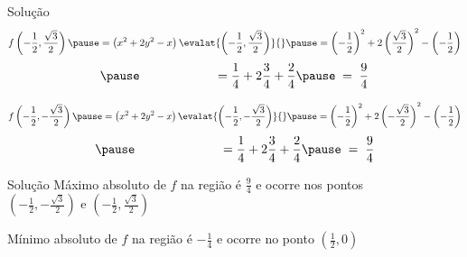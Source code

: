 \begin{resolution}{Solução}
  \[
    f\left(-\frac{1}{2}, \frac{\sqrt{3}}{2}\right)
    \pause
    = \left(x^2 + 2y^2 - x\right)\evalat{\left(-\frac{1}{2}, \frac{\sqrt{3}}{2}\right)}{}
    \pause
    = \left(-\frac{1}{2}\right)^2 + 2\left(\frac{\sqrt{3}}{2}\right)^2 - \left(-\frac{1}{2}\right)
  \]
  \[
    \pause
    \hphantom{f\left(-\frac{1}{2}, \frac{\sqrt{3}}{2}\right)}\,
    = \frac{1}{4} + 2\frac{3}{4} + \frac{2}{4}
    \pause
    \;=\; \frac{9}{4}
  \]

  \pause
  \[
    f\left(-\frac{1}{2}, -\frac{\sqrt{3}}{2}\right)
    \pause
    = \left(x^2 + 2y^2 - x\right)\evalat{\left(-\frac{1}{2}, -\frac{\sqrt{3}}{2}\right)}{}
    \pause
    = \left(-\frac{1}{2}\right)^2 + 2\left(-\frac{\sqrt{3}}{2}\right)^2 - \left(-\frac{1}{2}\right)
  \]
  \[
    \pause
    \hphantom{f\left(-\frac{1}{2}, -\frac{\sqrt{3}}{2}\right)}\,
    = \frac{1}{4} + 2\frac{3}{4} + \frac{2}{4}
    \pause
    \;=\; \frac{9}{4}
  \]
\end{resolution}

\begin{resolution}{Solução}
  Máximo absoluto de $f$ na região é \(\frac{9}{4}\) e ocorre nos pontos \\
  \(\left(-\frac{1}{2}, -\frac{\sqrt{3}}{2}\right)\) e
  \(\left(-\frac{1}{2},  \frac{\sqrt{3}}{2}\right)\)

  \vspace{\baselineskip}
  Mínimo absoluto de $f$ na região é \(-\frac{1}{4}\)
  e ocorre no ponto
  \(\left(\frac{1}{2}, 0\right)\)
\end{resolution}

